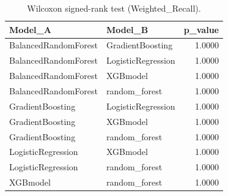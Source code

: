\begin{table}[t]
\centering
\begin{tabular}{llr}
\toprule
Model_A & Model_B & p_value \\
\midrule
BalancedRandomForest & GradientBoosting & 1.0000 \\
BalancedRandomForest & LogisticRegression & 1.0000 \\
BalancedRandomForest & XGBmodel & 1.0000 \\
BalancedRandomForest & random_forest & 1.0000 \\
GradientBoosting & LogisticRegression & 1.0000 \\
GradientBoosting & XGBmodel & 1.0000 \\
GradientBoosting & random_forest & 1.0000 \\
LogisticRegression & XGBmodel & 1.0000 \\
LogisticRegression & random_forest & 1.0000 \\
XGBmodel & random_forest & 1.0000 \\
\bottomrule
\end{tabular}
\caption{Wilcoxon signed-rank test (Weighted_Recall).}
\label{tab:wilcoxon_Weighted_Recall}
\end{table}